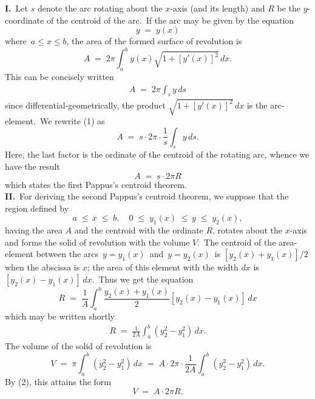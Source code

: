 \documentclass[12pt]{article}
\theoremstyle{definition}
\begin{document}
\textbf{I.}\, Let $s$ denote the arc rotating about the $x$-axis (and its length) and $R$ be the $y$-coordinate of the centroid of the arc.\, If the arc may be given by the equation
$$y \;=\; y(x)$$
where\, $a \le x \le b$, the area of the formed surface of revolution is
$$A \;=\; 2\pi\!\int_a^b\!y(x)\sqrt{1\!+\![y'(x)]^2}\,dx.$$
This can be concisely written
\begin{align}
A \;=\; 2\pi\!\int_s\!y\,ds
\end{align}
since differential-geometrically, the product $\sqrt{1\!+\![y'(x)]^2}\,dx$ is the arc-element.\, We rewrite (1) as
$$A \;=\; s\cdot2\pi\cdot\frac{1}{s}\!\int_s\!y\,ds.$$
Here, the last factor is the ordinate of the centroid of the rotating arc, whence we have the result
$$A \;=\; s \cdot2 \pi R$$
which states the first Pappus's centroid theorem.\\


\textbf{II.}\, For deriving the second Pappus's centroid theorem, we suppose that the region defined by
$$a \;\le\, x \;\le\; b, \quad 0 \;\le\; y_1(x) \;\le\, y \;\le\; y_2(x),$$
having the area $A$ and the centroid with the ordinate $R$, rotates about the $x$-axis and forms the solid of revolution with the volume $V$.\, The centroid of the area-element between the arcs\, $y = y_1(x)$\, and\, $y = y_2(x)$\, is $[y_2(x)\!+\!y_1(x)]/2$ when the abscissa is $x$; the area of this element with the width $dx$ is $[y_2(x)\!-\!y_1(x)]\,dx$.\, Thus we get the equation
$$R \;=\; \frac{1}{A}\int_a^b\frac{y_2(x)\!+\!y_1(x)}{2}[y_2(x)\!-y_1(x)]\,dx$$
which may be written shortly
\begin{align}
R \;=\; \frac{1}{2A}\int_a^b(y_2^2\!-\!y_1^2)\,dx.
\end{align}
The volume of the solid of revolution is
$$V \;=\; \pi\!\int_a^b(y_2^2\!-\!y_1^2)\,dx \;=\; A\cdot2\pi\cdot\frac{1}{2A}\!\int_a^b(y_2^2\!-\!y_1^2)\,dx.$$
By (2), this attains the form
$$V \;=\; A\cdot 2\pi R.$$

\end{document}
